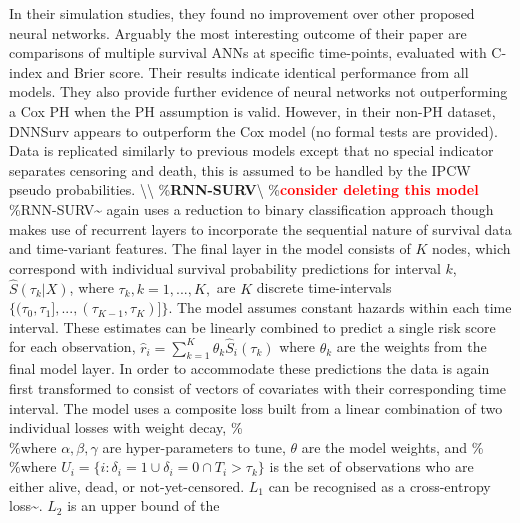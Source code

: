 \documentclass[
  letterpaper,
]{scrbook}
\theoremstyle{plain}
\theoremstyle{definition}
\theoremstyle{remark}
\begin{document}
In their simulation studies, they found no improvement over other
proposed neural networks. Arguably the most interesting outcome of their
paper are comparisons of multiple survival ANNs at specific time-points,
evaluated with C-index and Brier score. Their results indicate identical
performance from all models. They also provide further evidence of
neural networks not outperforming a Cox PH when the PH assumption is
valid. However, in their non-PH dataset, DNNSurv appears to outperform
the Cox model (no formal tests are provided). Data is replicated
similarly to previous models except that no special indicator separates
censoring and death, this is assumed to be handled by the IPCW pseudo
probabilities. \textbackslash\textbackslash{}
\%\textbf{RNN-SURV}\label{mod:rnnsurv}\textbackslash{}
\%\textbf{\textcolor{red}{consider deleting this model}}
\%RNN-SURV\textasciitilde{}\cite{Giunchiglia2018} again uses a reduction
to binary classification approach though makes use of recurrent layers
to incorporate the sequential nature of survival data and time-variant
features. The final layer in the model consists of \(K\) nodes, which
correspond with individual survival probability predictions for interval
\(k\), \(\hat{S}(\tau_k|X)\), where \(\tau_k, k = 1,...,K,\) are \(K\)
discrete time-intervals
\(\{(\tau_0, \tau_1],...,(\tau_{K-1}, \tau_K)]\}\). The model assumes
constant hazards within each time interval. These estimates can be
linearly combined to predict a single risk score for each observation,
\(\hat{r}_i = \sum^K_{k=1} \theta_k\hat{S}_i(\tau_k)\) where
\(\theta_k\) are the weights from the final model layer. In order to
accommodate these predictions the data is again first transformed to
consist of vectors of covariates with their corresponding time interval.
The model uses a composite loss built from a linear combination of two
individual losses with weight decay, \%\[
%
\] \%where \(\alpha, \beta, \gamma\) are hyper-parameters to tune,
\(\theta\) are the model weights, and \%\[
%
\] \%where
\(U_i = \{i : \delta_i = 1 \cup \delta_i = 0 \cap T_i > \tau_k\}\) is
the set of observations who are either alive, dead, or not-yet-censored.
\(L_1\) can be recognised as a cross-entropy
loss\textasciitilde{}\cite{Graf1999}. \(L_2\) is an upper bound of the
\end{document}
